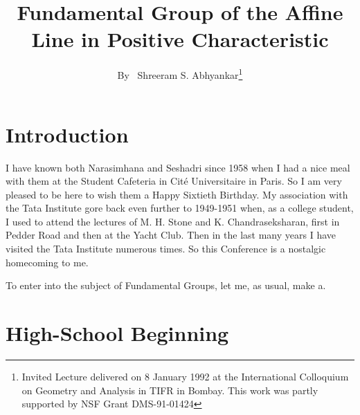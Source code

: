 \title{Fundamental Group of the Affine Line in Positive Characteristic}

\author{By~ Shreeram S. Abhyankar\footnote{Invited Lecture delivered on 8 January 1992 at the International Colloquium on Geometry and Analysis in TIFR in Bombay. This work was partly supported by NSF Grant DMS-91-01424}}

\date{}
\maketitle

\section{Introduction}\pageoriginale

I have known both Narasimhana and Seshadri since 1958 when I had a nice meal with them at the Student Cafeteria in Cit\'e Universitaire in Paris. So I am very pleased to be here to wish them a Happy Sixtieth Birthday. My association with the Tata Institute gore back even further to 1949-1951 when, as a college student, I used to attend the lectures of M. H. Stone and K. Chandraseksharan, first in Pedder Road and then at the Yacht Club. Then in the last many years I have visited the Tata Institute numerous times. So this Conference is a nostalgic homecoming to me.     

To enter into the subject of Fundamental Groups, let me, as usual, make a.

\section{High-School Beginning}

